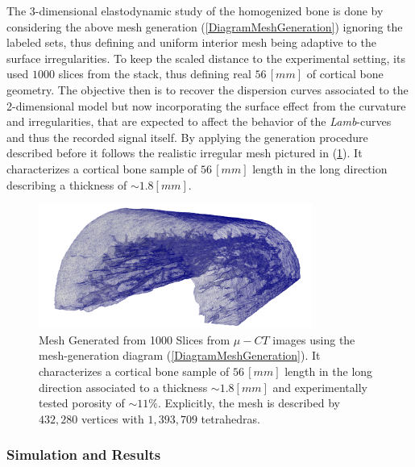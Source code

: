 The 3-dimensional elastodynamic study of the homogenized bone is done by considering the above mesh generation (\ref{DiagramMeshGeneration}) ignoring the labeled sets, thus defining and uniform interior mesh being adaptive to the surface irregularities.
To keep the scaled distance to the experimental setting, its used $1000$ slices from the stack, thus defining real $56 \, [mm]$ of cortical bone geometry.
The objective then is to recover the dispersion curves associated to the 2-dimensional model but now incorporating the surface effect from the curvature and irregularities, that are expected to affect the behavior of the \textit{Lamb}-curves and thus the recorded signal itself.
By applying the generation procedure described before it follows the realistic irregular mesh pictured in (\ref{HomBoneMeshFile}). It characterizes a cortical bone sample of $56 \, [mm]$ length in the long direction describing a thickness of $\sim 1.8 [mm]$. 

\begin{figure}[!h]
	\centering
	\includegraphics[width=0.8\textwidth]{images/ImgExt/CorticalBoneS1000OPT20-View.png}
	\caption{Mesh Generated from 1000 Slices from $\mu-CT$ images using the mesh-generation diagram (\ref{DiagramMeshGeneration}). It characterizes a cortical bone sample of $56 \, [mm]$ length in the long direction associated to a thickness $\sim 1.8 [mm]$ and experimentally tested porosity of $\sim 11 \%$. Explicitly, the mesh is described by $432,280$ vertices with $1,393,709$ tetrahedras.}
	\label{HomBoneMeshFile}
\end{figure} 

 \subsubsection{Simulation and Results}


